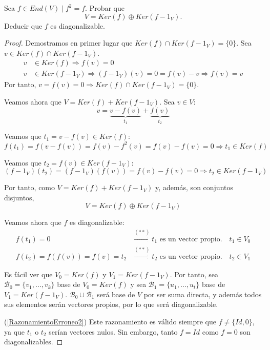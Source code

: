 \begin{ejercicio}
    Sea $f\in End(V) \mid f^2=f$. Probar que
    $$V = Ker(f) \oplus Ker(f-1_V).$$
    Deducir que $f$ es diagonalizable.
    \begin{proof}
        Demostramos en primer lugar que $Ker(f) \cap Ker(f-1_V) = \{0\}$. Sea $v\in Ker(f) \cap Ker(f-1_V)$.
        \begin{equation*}
            \begin{split}
                v&\in Ker(f) \Longrightarrow f(v) = 0\\
                v&\in Ker(f-1_V) \Longrightarrow (f-1_V)(v) = 0 = f(v) - v \Longrightarrow f(v) = v
            \end{split}
        \end{equation*}
        Por tanto, $v=f(v) = 0\Longrightarrow Ker(f) \cap Ker(f-1_V) = \{0\}$.
    
        Veamos ahora que $V=Ker(f) + Ker(f-1_V)$. Sea $v\in V$:
        $$v=\underbrace{v-f(v)}_{t_1} + \underbrace{f(v)}_{t_2}$$
    
        Veamos que $t_1 = v-f(v) \in Ker(f)$:
        $$f(t_1) = f(v-f(v)) = f(v) - f^2(v) = f(v) - f(v) = 0 \Longrightarrow t_1 \in Ker(f)$$
        
         Veamos que $t_2 = f(v) \in Ker(f-1_V)$:
        $$(f-1_V)(t_2) =  (f-1_V)(f(v)) = f(v)-f(v) = 0\Longrightarrow t_2 \in Ker(f-1_V)$$
    
        Por tanto, como $V=Ker(f) + Ker(f-1_V)$ y, además, son conjuntos disjuntos, $$V=Ker(f) \oplus Ker(f-1_V)$$
    
        Veamos ahora que $f$ es diagonalizable:
        \begin{equation}\label{RazonamientoErroneo2}\tag{$\ast\ast$}
        \begin{split}
            f(t_1) = 0 & \xrightarrow{(\ast\ast)} t_1 \text{ es un vector propio.}\quad t_1\in V_0 \\
            f(t_2) = f(f(v)) = f(v) = t_2 & \xrightarrow{(\ast\ast)} t_2 \text{ es un vector propio.}\quad t_2\in V_{1}
        \end{split}\end{equation}
    
        Es fácil ver que $V_0 = Ker(f)$ y $V_1 = Ker(f-1_V)$. Por tanto, sea $\mathcal{B}_0=\{v_1, \dots, v_k\}$ base de $V_0 = Ker(f)$ y sea $\mathcal{B}_1=\{u_1, \dots, u_t\}$ base de $V_1 = Ker(f-1_V)$. $\mathcal{B}_0 \cup \mathcal{B}_1$ será base de $V$ por ser suma directa, y además todos sus elementos serán vectores propios, por lo que será diagonalizable.
    
        (\ref{RazonamientoErroneo2}) Este razonamiento es válido siempre que $f\neq \{Id, 0\}$, ya que $t_1$ o $t_2$ serían vectores nulos. Sin embargo, tanto $f=Id$ como $f=0$ son diagonalizables.
    \end{proof}
\end{ejercicio}

